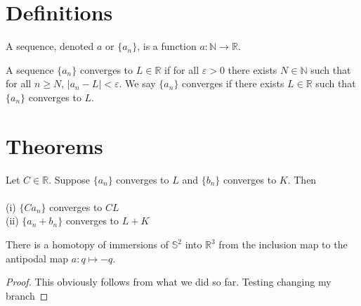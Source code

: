 %



\section{Definitions}

\begin{definition}[Sequence]
  \label{def:sequence}
  A sequence, denoted $a$ or $\{a_n\}$, is a function $a : ℕ → \mathbb{R}$.
\end{definition}

\begin{definition}[Convergence]
  \label{def:convergence}
  \leanok

  A sequence $\{a_n\}$ converges to $L ∈ \mathbb{R}$ if for all $\varepsilon > 0$ there exists
  $N ∈ ℕ$ such that for all $n ≥ N$, $|a_n - L| < \varepsilon$.
  We say $\{a_n\}$ converges if there exists $L ∈ \mathbb{R}$ such that $\{a_n\}$ converges to $L$.

\end{definition}


\section{Theorems}


\begin{theorem}
  \label{thm:limit_laws}

  Let $C \in \mathbb{R}$. Suppose $\{a_n\}$ converges to $L$ and $\{b_n\}$ converges to $K$. Then \\ \\
  (i) $\{C a_n\}$ converges to $C L$ \\
  (ii) $\{a_n + b_n\}$ converges to $L + K$ 

\end{theorem}

\begin{theorem}[Smale 1958]
  \label{thm:sphere_eversion}
  \leanok
  There is a homotopy of immersions of $𝕊^2$ into $ℝ^3$ from the inclusion map to
  the antipodal map $a : q ↦ -q$.
\end{theorem}
  
\begin{proof}
  \leanok
  This obviously follows from what we did so far. Testing changing my branch
\end{proof}
